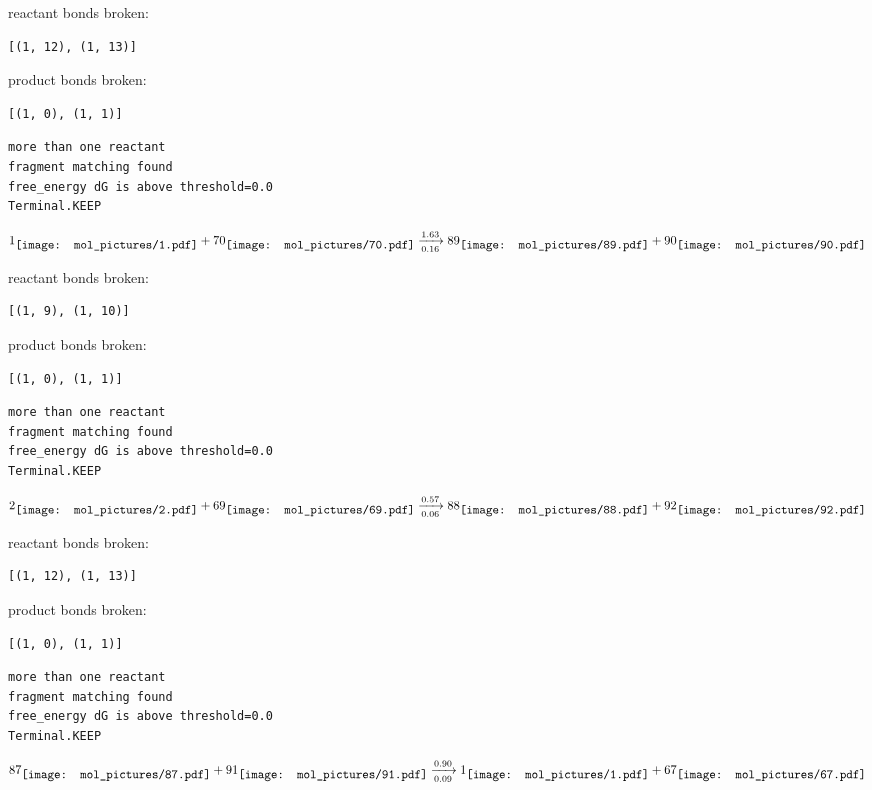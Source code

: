 \documentclass{article}
\begin{document}
reactant bonds broken:\begin{verbatim}
[(1, 12), (1, 13)]
\end{verbatim}
product bonds broken:\begin{verbatim}
[(1, 0), (1, 1)]
\end{verbatim}




\vspace{1cm}
\begin{verbatim}
more than one reactant
fragment matching found
free_energy dG is above threshold=0.0
Terminal.KEEP
\end{verbatim}
$$
1
\raisebox{-.5\height}{\texttt{[image: mol\_pictures/1.pdf]}}
+
70
\raisebox{-.5\height}{\texttt{[image: mol\_pictures/70.pdf]}}
\xrightarrow[0.16]{1.63}
89
\raisebox{-.5\height}{\texttt{[image: mol\_pictures/89.pdf]}}
+
90
\raisebox{-.5\height}{\texttt{[image: mol\_pictures/90.pdf]}}
$$


reactant bonds broken:\begin{verbatim}
[(1, 9), (1, 10)]
\end{verbatim}
product bonds broken:\begin{verbatim}
[(1, 0), (1, 1)]
\end{verbatim}




\vspace{1cm}
\begin{verbatim}
more than one reactant
fragment matching found
free_energy dG is above threshold=0.0
Terminal.KEEP
\end{verbatim}
$$
2
\raisebox{-.5\height}{\texttt{[image: mol\_pictures/2.pdf]}}
+
69
\raisebox{-.5\height}{\texttt{[image: mol\_pictures/69.pdf]}}
\xrightarrow[0.06]{0.57}
88
\raisebox{-.5\height}{\texttt{[image: mol\_pictures/88.pdf]}}
+
92
\raisebox{-.5\height}{\texttt{[image: mol\_pictures/92.pdf]}}
$$


reactant bonds broken:\begin{verbatim}
[(1, 12), (1, 13)]
\end{verbatim}
product bonds broken:\begin{verbatim}
[(1, 0), (1, 1)]
\end{verbatim}




\vspace{1cm}
\begin{verbatim}
more than one reactant
fragment matching found
free_energy dG is above threshold=0.0
Terminal.KEEP
\end{verbatim}
$$
87
\raisebox{-.5\height}{\texttt{[image: mol\_pictures/87.pdf]}}
+
91
\raisebox{-.5\height}{\texttt{[image: mol\_pictures/91.pdf]}}
\xrightarrow[0.09]{0.90}
1
\raisebox{-.5\height}{\texttt{[image: mol\_pictures/1.pdf]}}
+
67
\raisebox{-.5\height}{\texttt{[image: mol\_pictures/67.pdf]}}
$$
\end{document}
